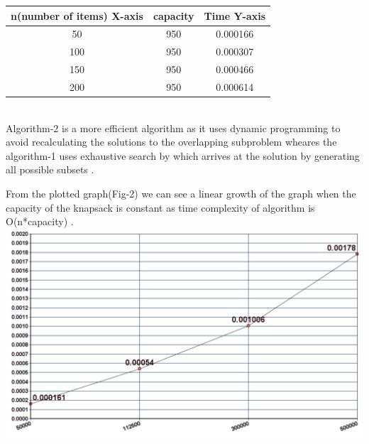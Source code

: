 \documentclass[twocolumn]{article}
\begin{document}
\begin{center}
	\begin{tabular}{ |c | c | c | }
	\hline
	
n(number of items)
X-axis
&
capacity&
Time
Y-axis




 \\
	 \hline


50&
950&
0.000166



\\
	\hline



100&
950&
0.000307



\\
\hline


150&
950&
0.000466


\\
\hline


200&
950&
0.000614



\\
\hline
	\end{tabular}
\end{center}
\\
Algorithm-2 is a more efficient algorithm as it uses dynamic programming to avoid recalculating the solutions to the overlapping subproblem wheares  the algorithm-1 uses exhaustive search by which arrives at the solution by generating all possible subsets .

From the plotted graph(Fig-2) we can see a linear growth of the graph when the capacity of the knapsack is constant as time complexity of algorithm is O(n*capacity)
 \vspace{10px}.
\\
\includegraphics[width=.45\textwidth]{para3.png}
\end{document}
